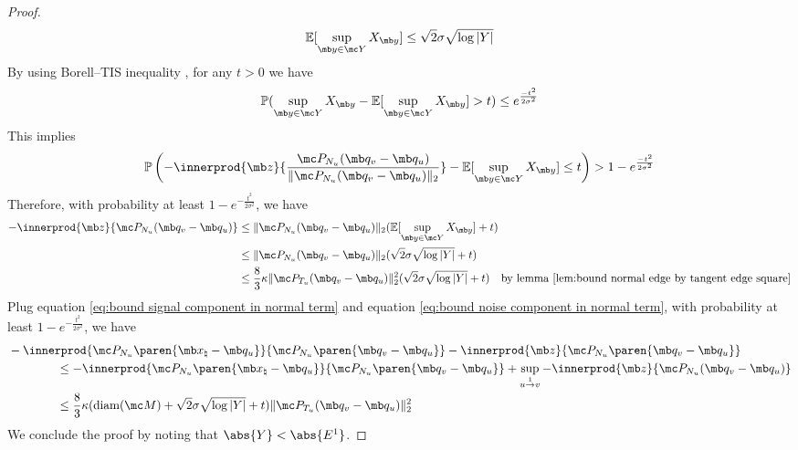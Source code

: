 \begin{proof}
\begin{equation}
     \mathbb E[\sup_{\mb y \in \mc Y} X_{\mb y}]
     \leq \sqrt{2} \sigma \sqrt{\log |Y|}
\end{equation}
By using Borell–TIS inequality \cite{adler2007gaussian}, for any $t > 0$ we have
\begin{equation}
    \mathbb P(\sup_{\mb y \in \mc Y} X_{\mb y} - \mathbb E[\sup_{\mb y \in \mc Y} X_{\mb y}] > t) 
    \leq e^{\frac{-t^2}{2\sigma^2}}
\end{equation}
This implies 
\begin{equation}
    \mathbb P \left( -\innerprod{\mb z}{\frac{\mc P_{N_u}(\mb q_v - \mb q_u)}{\| \mc P_{N_u}(\mb q_v - \mb q_u) \|_2}} -  \mathbb E[\sup_{\mb y \in \mc Y} X_{\mb y}] \leq t \right) 
    > 1-  e^{\frac{-t^2}{2\sigma^2}}
\end{equation}
Therefore, with probability at least $1-e^{-\frac{t^2}{2\sigma^2}}$, we have
\begin{equation}\label{eq:bound noise component in normal term}
    \begin{aligned}
     -\innerprod{\mb z}{\mc P_{N_u}(\mb q_v - \mb q_u)}
    &\leq \| \mc P_{N_u}(\mb q_v - \mb q_u) \|_2 (\mathbb E[\sup_{\mb y \in \mc Y} X_{\mb y}] +  t) \\
    &\leq  \| \mc P_{N_u}(\mb q_v - \mb q_u) \|_2 (\sqrt{2} \sigma \sqrt{\log |Y|} + t)\\
    &\leq \frac{8}{3} \kappa \| \mc P_{T_u}(\mb q_v - \mb q_u) \|_2^2 (\sqrt{2} \sigma \sqrt{\log |Y|} + t) \quad \text{by lemma \ref{lem:bound normal edge by tangent edge square}}
    \end{aligned}
\end{equation}
Plug equation \eqref{eq:bound signal component in normal term} and equation \eqref{eq:bound noise component in normal term}, with probability at least $1-e^{-\frac{t^2}{2\sigma^2}}$, we have
\begin{equation}
    \begin{aligned}
        &- \innerprod{\mc P_{N_u} \paren{\mb x_\natural - \mb q_u}}{\mc P_{N_u} \paren{\mb q_v - \mb q_u}} - \innerprod{\mb z}{\mc P_{N_u} \paren{\mb q_v - \mb q_u}}
        \\
        &\qquad \qquad \leq - \innerprod{\mc P_{N_u} \paren{\mb x_\natural - \mb q_u}}{\mc P_{N_u} \paren{\mb q_v - \mb q_u}} + \sup_{u\overset{1}{\rightarrow}v} -\innerprod{\mb z}{\mc P_{N_u}(\mb q_v - \mb q_u)}\\
        &\qquad \qquad \leq \frac{8}{3} \kappa (\text{diam}(\mc M) + \sqrt{2} \sigma \sqrt{\log |Y|} + t) \| \mc P_{T_u}(\mb q_v - \mb q_u) \|_2^2
    \end{aligned}
\end{equation}
We conclude the proof by noting that $\abs{Y} < \abs{E^1}$. 
\end{proof}







